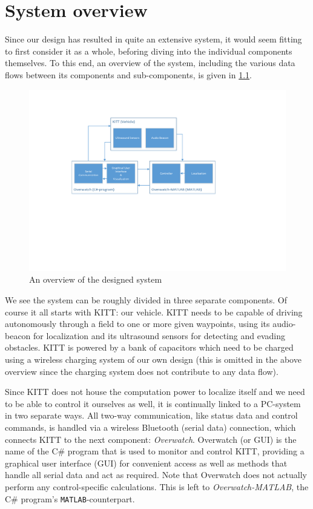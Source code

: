 \documentclass[11pt,titlepage]{report}
\begin{document}
\chapter{System overview}
Since our design has resulted in quite an extensive system, it would seem fitting to first consider it as a whole, beforing diving into the individual components themselves. To this end, an overview of the system, including the various data flows between its components and sub-components, is given in \ref{fig:system-overview}.

\begin{figure}[H]
	\centering
	\includegraphics[width=\linewidth]{resource/system-overview.pdf}
	\caption{An overview of the designed system}
	\label{fig:system-overview}
\end{figure}

We see the system can be roughly divided in three separate components. Of course it all starts with KITT: our vehicle. KITT needs to be capable of driving autonomously through a field to one or more given waypoints, using its audio-beacon for localization and its ultrasound sensors for detecting and evading obstacles. KITT is powered by a bank of capacitors which need to be charged using a wireless charging system of our own design (this is omitted in the above overview since the charging system does not contribute to any data flow).

Since KITT does not house the computation power to localize itself and we need to be able to control it ourselves as well, it is continually linked to a PC-system in two separate ways. All two-way communication, like status data and control commands, is handled via a wireless Bluetooth (serial data) connection, which connects KITT to the next component: \emph{Overwatch}. Overwatch (or GUI) is the name of the C\# program that is used to monitor and control KITT, providing a graphical user interface (GUI) for convenient access as well as methods that handle all serial data and act as required. Note that Overwatch does not actually perform any control-specific calculations. This is left to \emph{Overwatch-MATLAB}, the C\# program's \texttt{MATLAB}-counterpart.
\end{document}
